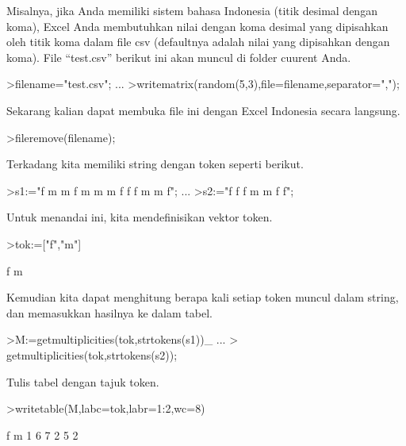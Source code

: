 \documentclass{article}
\begin{document}
\begin{eulernotebook}
\begin{eulercomment}
Misalnya, jika Anda memiliki sistem bahasa Indonesia (titik desimal
dengan koma), Excel Anda membutuhkan nilai dengan koma desimal yang
dipisahkan oleh titik koma dalam file csv (defaultnya adalah nilai
yang dipisahkan dengan koma). File “test.csv” berikut ini akan muncul
di folder cuurent Anda.
\end{eulercomment}
\begin{eulerprompt}
>filename="test.csv"; ...
>writematrix(random(5,3),file=filename,separator=",");
\end{eulerprompt}
\begin{eulercomment}
Sekarang kalian dapat membuka file ini dengan Excel Indonesia secara
langsung.
\end{eulercomment}
\begin{eulerprompt}
>fileremove(filename);
\end{eulerprompt}
\begin{eulercomment}
Terkadang kita memiliki string dengan token seperti berikut.
\end{eulercomment}
\begin{eulerprompt}
>s1:="f m m f m m m f f f m m f";  ...
>s2:="f f f m m f f";
\end{eulerprompt}
\begin{eulercomment}
Untuk menandai ini, kita mendefinisikan vektor token.
\end{eulercomment}
\begin{eulerprompt}
>tok:=["f","m"]
\end{eulerprompt}
\begin{euleroutput}
  f
  m
\end{euleroutput}
\begin{eulercomment}
Kemudian kita dapat menghitung berapa kali setiap token muncul dalam
string, dan memasukkan hasilnya ke dalam tabel.
\end{eulercomment}
\begin{eulerprompt}
>M:=getmultiplicities(tok,strtokens(s1))_ ...
>  getmultiplicities(tok,strtokens(s2));
\end{eulerprompt}
\begin{eulercomment}
Tulis tabel dengan tajuk token.
\end{eulercomment}
\begin{eulerprompt}
>writetable(M,labc=tok,labr=1:2,wc=8)
\end{eulerprompt}
\begin{euleroutput}
                 f       m
         1       6       7
         2       5       2
\end{euleroutput}

\end{eulernotebook}
\end{document}
